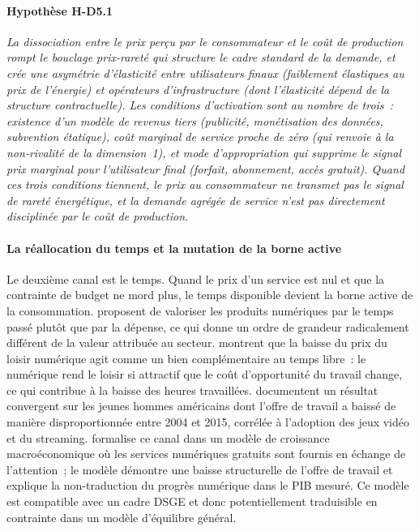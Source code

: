 \paragraph{Hypothèse H-D5.1} \emph{La dissociation entre le prix perçu par le consommateur et le coût de production rompt le bouclage prix-rareté qui structure le cadre standard de la demande, et crée une asymétrie d'élasticité entre utilisateurs finaux (faiblement élastiques au prix de l'énergie) et opérateurs d'infrastructure (dont l'élasticité dépend de la structure contractuelle). Les conditions d'activation sont au nombre de trois~: existence d'un modèle de revenus tiers (publicité, monétisation des données, subvention étatique), coût marginal de service proche de zéro (qui renvoie à la non-rivalité de la dimension~1), et mode d'appropriation qui supprime le signal prix marginal pour l'utilisateur final (forfait, abonnement, accès gratuit). Quand ces trois conditions tiennent, le prix au consommateur ne transmet pas le signal de rareté énergétique, et la demande agrégée de service n'est pas directement disciplinée par le coût de production.}


\paragraph{La réallocation du temps et la mutation de la borne active}

\markREG

Le deuxième canal est le temps. Quand le prix d'un service est nul et que la contrainte de budget ne mord plus, le temps disponible devient la borne active de la consommation. \textcite{goolsbee_valuing_2006} proposent de valoriser les produits numériques par le temps passé plutôt que par la dépense, ce qui donne un ordre de grandeur radicalement différent de la valeur attribuée au secteur. \textcite{kopytov_cheap_2023} montrent que la baisse du prix du loisir numérique agit comme un bien complémentaire au temps libre~: le numérique rend le loisir si attractif que le coût d'opportunité du travail change, ce qui contribue à la baisse des heures travaillées. \textcite{aguiar_leisure_2021} documentent un résultat convergent sur les jeunes hommes américains dont l'offre de travail a baissé de manière disproportionnée entre 2004 et 2015, corrélée à l'adoption des jeux vidéo et du streaming. \textcite{rachel_leisure_2024} formalise ce canal dans un modèle de croissance macroéconomique où les services numériques gratuits sont fournis en échange de l'attention~; le modèle démontre une baisse structurelle de l'offre de travail et explique la non-traduction du progrès numérique dans le PIB mesuré. Ce modèle est compatible avec un cadre DSGE et donc potentiellement traduisible en contrainte dans un modèle d'équilibre général.

